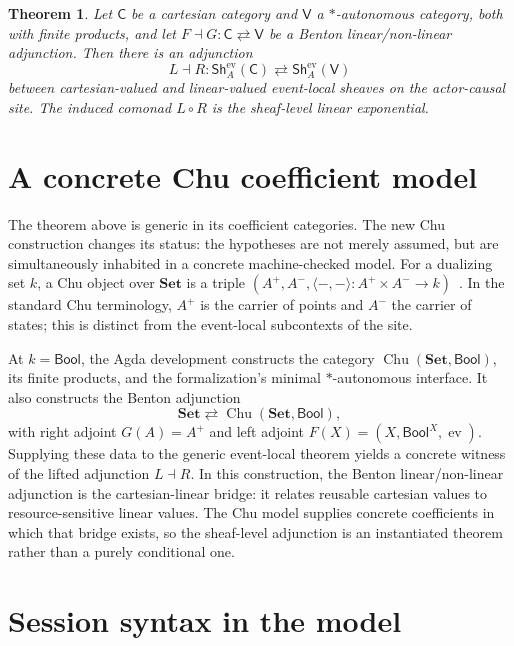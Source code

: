 \documentclass[11pt]{article}
\newtheorem*{theorem}{Theorem}
\newcommand{\EvSh}{\mathsf{Sh}^{\mathrm{ev}}}
\newcommand{\Cart}{\mathsf{C}}
\newcommand{\Vcat}{\mathsf{V}}
\newcommand{\Set}{\mathbf{Set}}
\newcommand{\Bool}{\mathsf{Bool}}
\newcommand{\Chu}{\operatorname{Chu}}
\begin{document}
\begin{theorem}
Let $\Cart$ be a cartesian category and $\Vcat$ a $*$-autonomous category, both
with finite products, and let $F\dashv G:\Cart\rightleftarrows\Vcat$ be a
Benton linear/non-linear adjunction. Then there is an adjunction
\[
  L \dashv R : \EvSh_A(\Cart)\rightleftarrows\EvSh_A(\Vcat)
\]
between cartesian-valued and linear-valued event-local sheaves on the
actor-causal site. The induced comonad $L\circ R$ is the sheaf-level linear
exponential.
\end{theorem}

\section*{A concrete Chu coefficient model}

The theorem above is generic in its coefficient categories. The new Chu
construction changes its status: the hypotheses are not merely assumed, but are
simultaneously inhabited in a concrete machine-checked model. For a dualizing
set $k$, a Chu object over $\Set$ is a triple
$(A^+,A^-,\langle-,-\rangle:A^+\times A^-\to k)$~\cite{Barr1996,Pratt1995}.
In the standard Chu terminology, $A^+$ is the carrier of points and $A^-$ the
carrier of states; this is distinct from the event-local subcontexts of the
site.

At $k=\Bool$, the Agda development constructs the category
$\Chu(\Set,\Bool)$, its finite products, and the formalization's minimal
$*$-autonomous interface. It also constructs the Benton adjunction
\[
  \Set\rightleftarrows\Chu(\Set,\Bool),
\]
with right adjoint $G(A)=A^+$ and left adjoint
$F(X)=(X,\Bool^X,\operatorname{ev})$. Supplying these data to the generic
event-local theorem yields a concrete witness of the lifted adjunction
$L\dashv R$. In this construction, the Benton linear/non-linear adjunction is
the cartesian-linear bridge: it relates reusable cartesian values to
resource-sensitive linear values. The Chu model supplies concrete coefficients
in which that bridge exists, so the sheaf-level adjunction is an instantiated
theorem rather than a purely conditional one.

\section*{Session syntax in the model}
\end{document}
